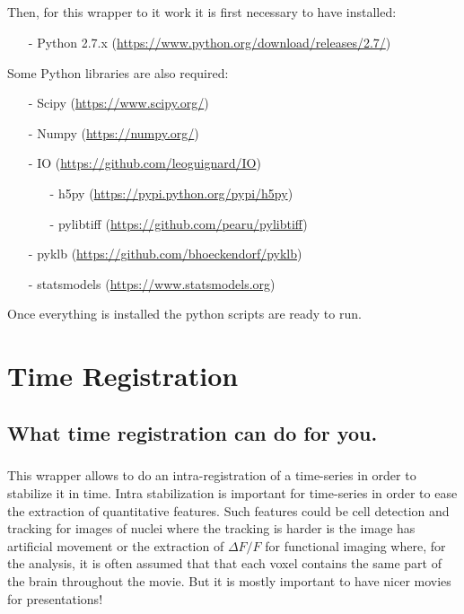 \documentclass[10pt,a4paper]{book}
\begin{document}
{\paragraph{}Then, for this wrapper to it work it is first necessary to have installed:
\begin{enumerate}
\item[-] Python 2.7.x (\url{https://www.python.org/download/releases/2.7/})
\end{enumerate}
Some Python libraries are also required:
\begin{enumerate}
\item[-] Scipy (\url{https://www.scipy.org/})
\item[-] Numpy (\url{https://numpy.org/})
\item[-] IO (\url{https://github.com/leoguignard/IO})
\begin{enumerate}
\item[-] h5py (\url{https://pypi.python.org/pypi/h5py})
\item[-] pylibtiff (\url{https://github.com/pearu/pylibtiff})
\end{enumerate}
\item[-] pyklb (\url{https://github.com/bhoeckendorf/pyklb})
\item[-] statsmodels (\url{https://www.statsmodels.org})
\end{enumerate}
Once everything is installed the python scripts are ready to run.}
\chapter{Time Registration}
\section{What time registration can do for you.}
\paragraph{}This wrapper allows to do an intra-registration of a time-series in order to stabilize it in time. Intra stabilization is important for time-series in order to ease the extraction of quantitative features. Such features could be cell detection and tracking for images of nuclei where the tracking is harder is the image has artificial movement or the extraction of $\Delta F/F$ for functional imaging where, for the analysis, it is often assumed that that each voxel contains the same part of the brain throughout the movie. But it is mostly important to have nicer movies for presentations!
\end{document}
